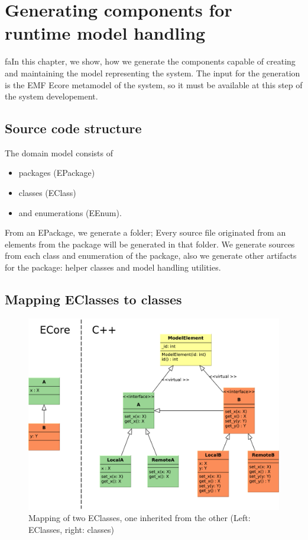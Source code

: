 \chapter{Generating components for runtime model handling}

faIn this chapter, we show, how we generate the \cpp{} components capable of creating and maintaining the model representing the system. 
The input for the generation is the EMF Ecore metamodel of the system, so it must be available at this step of the system developement. 


\section{Source code structure}

The domain model consists of 
\begin{itemize}
	\item packages (EPackage)
	\item classes (EClass) 
	\item and enumerations (EEnum).
\end{itemize}

From an EPackage, we generate a folder; Every source file originated from an elements from the package will be generated in that folder. 
We generate sources from each class and enumeration of the package, also we generate other artifacts for the package: helper classes and model handling utilities.


\section{Mapping EClasses to \protect\cpptt{} classes}


\begin{figure}
	\begin{center}
		\includegraphics[width=\textwidth]{figures/eclass-to-cpp.pdf}
		\caption{Mapping of two EClasses, one inherited from the other (Left: EClasses, right: \protect\cpp{} classes) }
		\label{fig:eclass-to-cpp}
	\end{center}
\end{figure}



